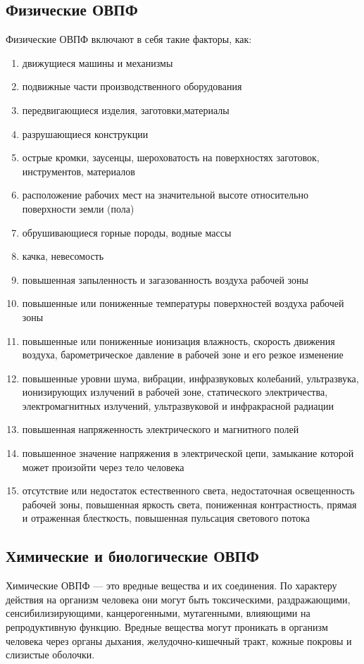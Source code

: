 \subsection*{Физические ОВПФ}
Физические ОВПФ включают в себя такие факторы, как:
\begin{multicols*}{2}
\begin{enumerate}
    \item движущиеся машины и механизмы
    \item подвижные части производственного оборудования
    \item передвигающиеся изделия, заготовки,материалы
    \item разрушающиеся конструкции
    \item острые кромки, заусенцы, шероховатость на поверхностях заготовок, инструментов, материалов
    \item расположение рабочих мест на значительной высоте относительно поверхности земли (пола)
    \item обрушивающиеся горные породы, водные массы
    \item качка, невесомость
    \item повышенная запыленность и загазованность воздуха рабочей зоны
    \item повышенные или пониженные температуры поверхностей воздуха рабочей зоны
    \item повышенные или пониженные ионизация влажность, скорость движения воздуха, барометрическое давление в рабочей зоне и его резкое изменение
    \item повышенные уровни шума, вибрации, инфразвуковых колебаний, ультразвука, ионизирующих излучений в рабочей зоне, статического электричества, электромагнитных излучений, ультразвуковой и инфракрасной радиации
    \item повышенная напряженность электрического и магнитного полей
    \item повышенное значение напряжения в электрической цепи, замыкание которой может произойти через тело человека
    \item отсутствие или недостаток естественного света, недостаточная освещенность рабочей зоны, повышенная яркость света, пониженная контрастность, прямая и отраженная блесткость, повышенная пульсация светового потока
\end{enumerate}
\end{multicols*}


\subsection*{Химические и биологические ОВПФ}
Химические ОВПФ --- это вредные вещества и их соединения. По характеру действия на организм человека они могут быть токсическими, раздражающими, сенсибилизирующими, канцерогенными, мутагенными, влияющими на репродуктивную функцию. Вредные вещества могут проникать в организм человека через органы дыхания, желудочно-кишечный тракт, кожные покровы и слизистые оболочки.


